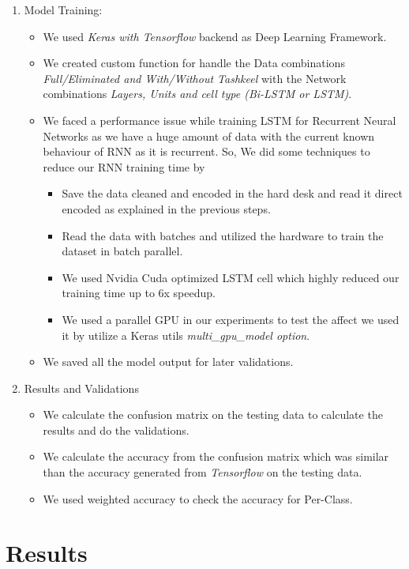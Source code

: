 \begin{enumerate}
  \item Model Training:
  \begin{itemize}
    \item We used \textit{Keras with Tensorflow} backend as Deep Learning Framework.
    \item We created custom function for handle the Data combinations \textit{Full/Eliminated and With/Without Tashkeel} with the Network combinations \textit{Layers, Units and cell type (Bi-LSTM or LSTM)}.
    \item We faced a performance issue while training LSTM for Recurrent Neural Networks as we have a huge amount of data with the current known behaviour of RNN as it is recurrent. So, We did some techniques to reduce our RNN training time by
    \begin{itemize}
      \item Save the data cleaned and encoded in the hard desk and read it direct encoded as explained in the previous steps.
      \item Read the data with batches and utilized the hardware to train the dataset in batch parallel.
      \item We used Nvidia Cuda optimized LSTM cell which highly reduced our training time up to 6x speedup.
      \item We used a parallel GPU in our experiments to test the affect we used it by utilize a Keras utils \textit{multi\_gpu\_model option}.
    \end{itemize}
    \item We saved all the model output for later validations.
  \end{itemize}  

  \item Results and Validations
  \begin{itemize}
    \item We calculate the confusion matrix on the testing data to calculate the results and do the validations.
    \item We calculate the accuracy from the confusion matrix which was similar than the accuracy generated from \textit{Tensorflow} on the testing data.
    \item We used weighted accuracy to check the accuracy for Per-Class.
  \end{itemize}
  
\end{enumerate}

\clearpage

\section{Results}\label{Sec:Results}

